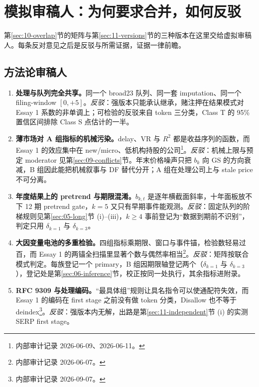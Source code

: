 \documentclass[a4paper,11pt]{ctexart}
\begin{document}
\section{模拟审稿人：为何要求合并，如何反驳}\label{sec:12-referees}

第\ref{sec:10-overlap}节的矩阵与第\ref{sec:11-versions}节的三种版本在这里交给虚拟审稿人。每条反对意见之后是反驳与所需证据，证据一律前瞻。

\subsection{方法论审稿人}\label{sec:12-methodology}

\begin{enumerate}[label=M\arabic*., leftmargin=*, itemsep=4pt]
\item \textbf{处理与队列完全共享。}同一个 broad23 队列、同一套 imputation、同一个 filing-window $[0,+5]$\citep{borusyakjaravelspiess2024}。\emph{反驳}：强版本只能承认继承，赌注押在结果模式对 Essay 1 系数的非单调上\citep{davilaparlatore2021}；可检验的反驳来自 token 三分类，Class T 的 95\% 置信区间排除 Class S 点估计的一半。

\item \textbf{薄市场对 A 组指标的机械污染。}delay、VR 与 $R^2$ 都是收益序列的函数\citep{houmoskowitz2005,lomackinlay1988,morckyeungyu2000,goyenkoholdentrzcinka2009}，而 Essay 1 的效应集中在 new/micro、低机构持股的公司\footnote{内部审计记录 2026-06-09、2026-06-11。}。\emph{反驳}：机械上限与预定 moderator 见第\ref{sec:09-conflicts}节。年末价格噪声只把 $b_k$ 向 GS 的方向衰减，B 组因此能把机械叙事与 DF 替代分开；A 组在处理公司上与 stale price 不可分离。

\item \textbf{年度结果上的 pretrend 与期限混淆。}$b_{k,t}$ 是逐年横截面斜率，十年面板放不下 12 期 pretrend gate，$k=5$ 又只有早期事件能观测\citep{bakerlarckerwang2022,sunabraham2021}。\emph{反驳}：固定队列的阶梯规则见第\ref{sec:05-long}节 (i)--(iii)，$k\ge 4$ 事前登记为“数据到期前不识别”，判定只用 $\delta_{k=1}$ 与 $\delta_{k=3}$。

\item \textbf{大因变量电池的多重检验。}四组指标乘期限、窗口与事件锚，检验数轻易过百，而 Essay 1 的两锚全扫描里显著个数与偶然率相当\footnote{内部审计记录 2026-06-07。}。\emph{反驳}：矩阵按联合模式判定。每族登记一个 primary，B 组因期限轴登记两个（$\delta_{k=1}$ 与 $\delta_{k=3}$），登记处是第\ref{sec:06-inference}节，校正按同一处执行，其余指标进附录。

\item \textbf{RFC 9309 与处理编码。}“最具体组”规则让具名指令可以使通配符失效，而 Essay 1 的编码在 first stage 之前没有做 token 分类，Disallow 也不等于 deindex\footnote{内部审计记录 2026-09-07。}。\emph{反驳}：强版本内无解，出路是第\ref{sec:11-independent}节 (i) 的实测 SERP first stage。
\end{enumerate}
\end{document}
